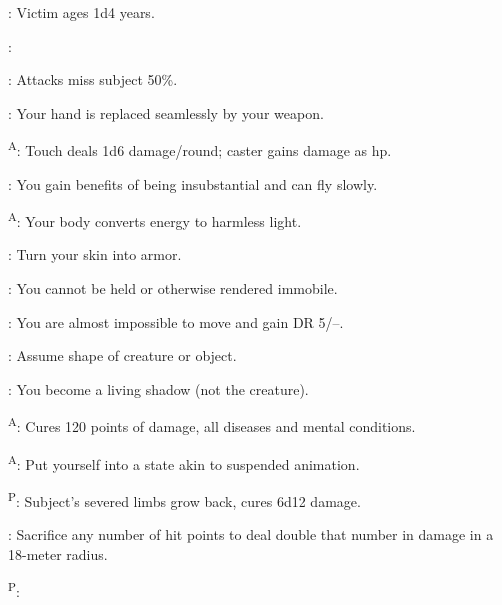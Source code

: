 \begin{enumerate*}
\item {}: Victim ages 1d4 years.

      :

      :  Attacks miss subject 50\%.

      : Your hand is replaced seamlessly by your weapon. %

      \textsuperscript{A}: Touch deals 1d6 damage/round; caster gains damage as hp.

\item {}: You gain benefits of being insubstantial and can fly slowly. %

      \textsuperscript{A}: Your body converts energy to harmless light.

      : Turn your skin into armor.

      : You cannot be held or otherwise rendered immobile.

\item {}: You are almost impossible to move and gain DR 5/--.

      : Assume shape of creature or object. %

      : You become a living shadow (not the creature). %

\item {}\textsuperscript{A}: Cures 120 points of damage, all diseases and mental conditions.

      \textsuperscript{A}: Put yourself into a state akin to suspended animation. %

\item {}\textsuperscript{P}: Subject's severed limbs grow back, cures 6d12 damage.

\item {}: Sacrifice any number of hit points to deal double that number in damage in a 18-meter radius.

\item {}\textsuperscript{P}:
\end{enumerate*}



